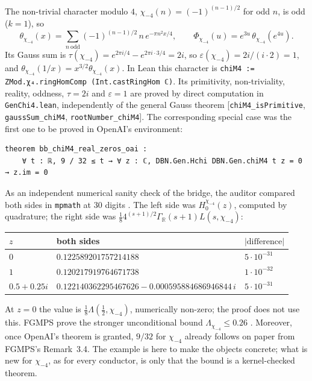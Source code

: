 \documentclass[11pt]{article}
\theoremstyle{definition}
\newcommand{\lean}[1]{\texttt{#1}}
\newcommand{\GR}{\Gamma_{\mathbb{R}}}
\newcommand{\Lc}{\Lambda}
\begin{document}
The non-trivial character modulo $4$, $\chi_{-4}(n) = (-1)^{(n-1)/2}$ for odd $n$, is odd ($k = 1$), so
\[
\theta_{\chi_{-4}}(x) = \sum_{n\ \mathrm{odd}}(-1)^{(n-1)/2}\,n\,e^{-\pi n^2x/4},\qquad
\Phi_{\chi_{-4}}(u) = e^{3u}\,\theta_{\chi_{-4}}(e^{4u}).
\]
Its Gauss sum is $\tau(\chi_{-4}) = e^{2\pi i/4} - e^{2\pi i\cdot3/4} = 2i$, so $\varepsilon(\chi_{-4}) = 2i/(i\cdot2) = 1$, and $\theta_{\chi_{-4}}(1/x) = x^{3/2}\theta_{\chi_{-4}}(x)$. In Lean this character is \lstinline[basicstyle=\ttfamily,backgroundcolor={}]|chiM4 := ZMod.χ₄.ringHomComp (Int.castRingHom ℂ)|. Its primitivity, non-triviality, reality, oddness, $\tau = 2i$ and $\varepsilon = 1$ are proved by direct computation in \lean{GenChi4.lean}, independently of the general Gauss theorem [\lean{chiM4\_\allowbreak{}isPrimitive}, \lean{gaussSum\_\allowbreak{}chiM4}, \lean{rootNumber\_\allowbreak{}chiM4}]. The corresponding special case was the first one to be proved in OpenAI's environment:
\begin{lstlisting}
theorem bb_chiM4_real_zeros_oai :
    ∀ t : ℝ, 9 / 32 ≤ t → ∀ z : ℂ, DBN.Gen.Hchi DBN.Gen.chiM4 t z = 0 → z.im = 0
\end{lstlisting}
As an independent numerical sanity check of the bridge, the auditor compared both sides in \lean{mpmath} at 30 digits \cite[REVIEW\_D2b\_BRIDGE]{bbrecords}. The left side was $H^{\chi_{-4}}_0(z)$, computed by quadrature; the right side was $\tfrac18 4^{(s+1)/2}\GR(s+1)L(s,\chi_{-4})$:
\begin{center}\small
\begin{tabular}{@{}lll@{}}
\toprule
$z$ & both sides & $|\text{difference}|$ \\
\midrule
$0$ & $0.122589201757214188$ & $5\cdot10^{-31}$ \\
$1$ & $0.120217919764671738$ & $1\cdot10^{-32}$ \\
$0.5 + 0.25i$ & $0.122140362295467626 - 0.000595884686946844\,i$ & $5\cdot10^{-31}$ \\
\bottomrule
\end{tabular}
\end{center}
At $z = 0$ the value is $\tfrac18\Lc(\tfrac12,\chi_{-4})$, numerically non-zero; the proof does not use this. FGMPS prove the stronger unconditional bound $\Lc_{\chi_{-4}} \le 0.26$ \cite[\S7.5]{FGMPS2026}. Moreover, once OpenAI's theorem is granted, $9/32$ for $\chi_{-4}$ already follows on paper from FGMPS's Remark~3.4. The example is here to make the objects concrete; what is new for $\chi_{-4}$, as for every conductor, is only that the bound is a kernel-checked theorem.
\end{document}
